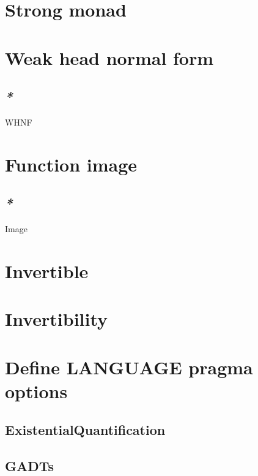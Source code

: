 \documentclass[a4paper,14pt,oneside]{book}
\begin{document}
\chapter{\label{org25903d0}Strong monad}
\label{sec:org433662c}

\chapter{\label{org318be90}Weak head normal form}
\label{sec:org1f4f9f6}

\section{\emph{*}}
\label{sec:org2fa8c91}

\label{org2b4b705}WHNF\\

\chapter{\label{org7c139ac}Function image}
\label{sec:orgccd7f43}

\section{\emph{*}}
\label{sec:orgd1819d9}

\label{orga531a2e}Image\\

\chapter{\label{org71d5c16}Invertible}
\label{sec:org03e010a}
\chapter{\label{org862dc66}Invertibility}
\label{sec:org508762a}
\chapter{\label{orgc4abc37}Define LANGUAGE pragma options}
\label{sec:orgeb5ca5d}

\section{\label{org006cafa}ExistentialQuantification}
\label{sec:orga055a65}

\section{\label{orgc7fa4ac}GADTs}
\label{sec:org07a3421}
\end{document}
